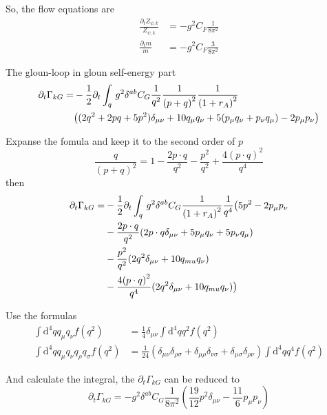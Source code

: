 \documentclass[UTF8]{ctexart}
\begin{document}
\par So, the flow equations are
\begin{align}
\frac{\partial_{t}Z_{\psi,k}}{Z_{\psi,k}}&=-g^{2}C_F\frac{1}{8{\pi}^2}
\\\frac{\partial_{t}m}{m}&=-g^{2}C_F\frac{3}{8{\pi}^2}
\end{align}
\par The gloun-loop in gloun self-energy part
\begin{align}
\partial_{t}\Gamma_{kG}=
&-\frac{1}{2}\partial_{t}\int_{q}\,g^{2}\delta^{ab}C_{G}\frac{1}{q^2}\frac{1}{{(p+q)}^2}\frac{1}{{(1+r_{A})}^2}
\notag\\&\big((2q^2+2pq+5p^2)\delta_{\mu\nu}+10q_{\mu}q_{\nu}+5(p_{\mu}q_{\nu}+p_{\nu}q_{\mu})-2p_{\mu}p_{\nu}\big)
\end{align}
\par Expanse the fomula and keep it to the second order of $p$
\begin{equation}
\frac{q}{{(p+q)}^2}=1-\frac{2p\cdot q}{q^2}-\frac{p^2}{q^2}+\frac{4{(p\cdot q)}^2}{q^4}
\end{equation}
then
\begin{align}
\partial_{t}\Gamma_{kG}=
&-\frac{1}{2}\partial_{t}\int_{q}\,g^{2}\delta^{ab}C_{G}\frac{1}{{(1+r_{A})}^2}\frac{1}{q^4}\big(5p^{2}-2p_{\mu}p_{\nu}
\notag\\&-\frac{2p\cdot q}{q^2}(2p\cdot q\delta_{\mu\nu}+5p_{\mu}q_{\nu}+5p_{\nu}q_{\mu})
\notag\\&-\frac{p^2}{q^2}(2q^{2}\delta_{\mu\nu}+10q_{mu}q_{\nu})
\notag\\&-\frac{4{(p\cdot q)}^2}{q^4}(2q^{2}\delta_{\mu\nu}+10q_{mu}q_{\nu})\big)
\end{align}
\par Use the formulas
\begin{align}
\int{\mathrm{d}}^{4}qq_{\mu}q_{\nu}f(q^2)&=\frac{1}{4}\delta_{\mu\nu}\int{\mathrm{d}}^{4}qq^{2}f(q^2)
\\\int{\mathrm{d}}^{4}qq_{\mu}q_{\nu}q_{\rho}q_{\sigma}f(q^2)&=\frac{1}{24}(\delta_{\mu\nu}\delta_{\rho\sigma}+\delta_{\mu\rho}\delta_{\nu\sigma}+\delta_{\mu\sigma}\delta_{\rho\nu})\int{\mathrm{d}}^{4}qq^{4}f(q^2)
\end{align}
\par And calculate the integral, the $\partial_{t}\Gamma_{kG}$ can be reduced to
\begin{equation}
\partial_{t}\Gamma_{kG}=-g^{2}\delta^{ab}C_{G}\frac{1}{8\pi^2}(\frac{19}{12}p^{2}\delta_{\mu\nu}-\frac{11}{6}p_{\mu}p_{\nu})
\end{equation}
\end{document}
